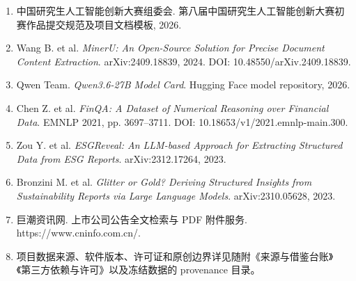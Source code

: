 \documentclass[UTF8,a4paper,11pt]{ctexart}
\begin{document}
\begin{enumerate}

\item

中国研究生人工智能创新大赛组委会. 第八届中国研究生人工智能创新大赛初赛作品提交规范及项目文档模板, 2026.\par

\item

Wang B. et al. \emph{MinerU: An Open-Source Solution for Precise Document Content Extraction}. arXiv:2409.18839, 2024. DOI: 10.48550/arXiv.2409.18839.\par

\item

Qwen Team. \emph{Qwen3.6-27B Model Card}. Hugging Face model repository, 2026.\par

\item

Chen Z. et al. \emph{FinQA: A Dataset of Numerical Reasoning over Financial Data}. EMNLP 2021, pp. 3697–3711. DOI: 10.18653/v1/2021.emnlp-main.300.\par

\item

Zou Y. et al. \emph{ESGReveal: An LLM-based Approach for Extracting Structured Data from ESG Reports}. arXiv:2312.17264, 2023.\par

\item

Bronzini M. et al. \emph{Glitter or Gold? Deriving Structured Insights from Sustainability Reports via Large Language Models}. arXiv:2310.05628, 2023.\par

\item

巨潮资讯网. 上市公司公告全文检索与 PDF 附件服务. https://www.cninfo.com.cn/.\par

\item

项目数据来源、软件版本、许可证和原创边界详见随附《来源与借鉴台账》《第三方依赖与许可》以及冻结数据的 provenance 目录。\par

\end{enumerate}
\end{document}
